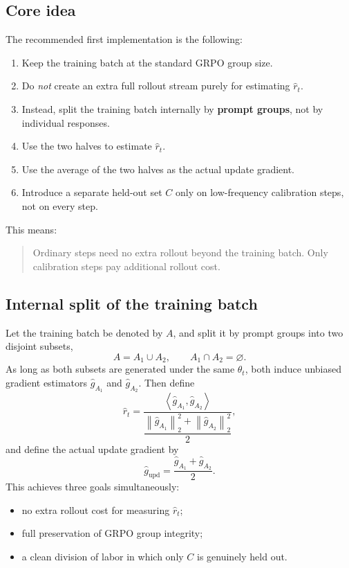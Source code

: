 \documentclass[11pt,a4paper]{article}
\newcommand{\norm}[1]{\left\lVert #1 \right\rVert_2}
\newcommand{\ip}[2]{\left\langle #1,#2 \right\rangle}
\newcommand{\ghat}{\hat g}
\newcommand{\rhat}{\hat r_t}
\begin{document}
\subsection{Core idea}
The recommended first implementation is the following:
\begin{enumerate}[label=\arabic*., leftmargin=2em]
    \item Keep the training batch at the standard GRPO group size.
    \item Do \emph{not} create an extra full rollout stream purely for estimating $\rhat$.
    \item Instead, split the training batch internally by \textbf{prompt groups}, not by individual responses.
    \item Use the two halves to estimate $\rhat$.
    \item Use the average of the two halves as the actual update gradient.
    \item Introduce a separate held-out set $C$ only on low-frequency calibration steps, not on every step.
\end{enumerate}
This means:
\begin{quote}
Ordinary steps need no extra rollout beyond the training batch. Only calibration steps pay additional rollout cost.
\end{quote}

\subsection{Internal split of the training batch}
Let the training batch be denoted by $A$, and split it by prompt groups into two disjoint subsets,
\begin{equation}
A = A_1 \cup A_2, \qquad A_1 \cap A_2 = \varnothing.
\end{equation}
As long as both subsets are generated under the same $\theta_t$, both induce unbiased gradient estimators $\ghat_{A_1}$ and $\ghat_{A_2}$. Then define
\begin{equation}
\rhat = \frac{\ip{\ghat_{A_1}}{\ghat_{A_2}}}{\dfrac{\norm{\ghat_{A_1}}^2 + \norm{\ghat_{A_2}}^2}{2}},
\end{equation}
and define the actual update gradient by
\begin{equation}
\ghat_{\mathrm{upd}} = \frac{\ghat_{A_1} + \ghat_{A_2}}{2}.
\end{equation}
This achieves three goals simultaneously:
\begin{itemize}[leftmargin=2em]
    \item no extra rollout cost for measuring $\rhat$;
    \item full preservation of GRPO group integrity;
    \item a clean division of labor in which only $C$ is genuinely held out.
\end{itemize}
\end{document}
